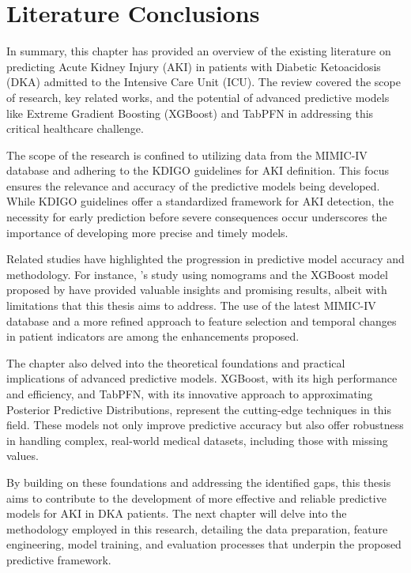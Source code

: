 \documentclass[../main.tex]{subfiles}
\begin{document}
\section{Literature Conclusions}

In summary, this chapter has provided an overview of the existing literature on predicting Acute Kidney Injury (AKI) in patients with Diabetic Ketoacidosis (DKA) admitted to the Intensive Care Unit (ICU). The review covered the scope of research, key related works, and the potential of advanced predictive models like Extreme Gradient Boosting (XGBoost) and TabPFN in addressing this critical healthcare challenge.

The scope of the research is confined to utilizing data from the MIMIC-IV database and adhering to the KDIGO guidelines for AKI definition. This focus ensures the relevance and accuracy of the predictive models being developed. While KDIGO guidelines offer a standardized framework for AKI detection, the necessity for early prediction before severe consequences occur underscores the importance of developing more precise and timely models.

Related studies have highlighted the progression in predictive model accuracy and methodology. For instance, \citeauthor{monogram-aki-dka}'s study using nomograms and the XGBoost model proposed by \citeauthor{xgboost-aki-dka} have provided valuable insights and promising results, albeit with limitations that this thesis aims to address. The use of the latest MIMIC-IV database and a more refined approach to feature selection and temporal changes in patient indicators are among the enhancements proposed.

The chapter also delved into the theoretical foundations and practical implications of advanced predictive models. XGBoost, with its high performance and efficiency, and TabPFN, with its innovative approach to approximating Posterior Predictive Distributions, represent the cutting-edge techniques in this field. These models not only improve predictive accuracy but also offer robustness in handling complex, real-world medical datasets, including those with missing values.

By building on these foundations and addressing the identified gaps, this thesis aims to contribute to the development of more effective and reliable predictive models for AKI in DKA patients. The next chapter will delve into the methodology employed in this research, detailing the data preparation, feature engineering, model training, and evaluation processes that underpin the proposed predictive framework.
\end{document}
